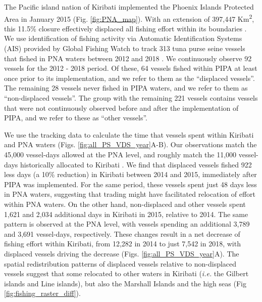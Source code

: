\documentclass[12pt]{article}
\begin{document}
The Pacific island nation of Kiribati implemented the Phoenix Islands Protected Area in January 2015 (Fig. \ref{fig:PNA_map}). With an extension of 397,447 Km\textsuperscript{2}, this 11.5\% closure effectively displaced all fishing effort within its boundaries \cite{mccauley_2016,mcdermott_2018}. We use identification of fishing activity via Automatic Identification Systems (AIS) provided by Global Fishing Watch to track 313 tuna purse seine vessels that fished in PNA waters between 2012 and 2018 \cite{kroodsma_2018}. We continuously observe 92 vessels for the 2012 - 2018 period. Of these, 64 vessels fished within PIPA at least once prior to its implementation, and we refer to them as the ``displaced vessels''. The remaining 28 vessels never fished in PIPA waters, and we refer to them as ``non-displaced vessels''. The group with the remaining 221 vessels contains vessels that were not continuously observed before and after the implementation of PIPA, and we refer to these as ``other vessels''.

We use the tracking data to calculate the time that vessels spent within Kiribati and PNA waters (Figs. \ref{fig:all_PS_VDS_year}A-B). Our observations match the 45,000 vessel-days allowed at the PNA level, and roughly match the 11,000 vessel-days historically allocated to Kiribati \cite{yeeting2018stabilising}. We find that displaced vessels fished 922 less days (a 10\% reduction) in Kiribati between 2014 and 2015, immediately after PIPA was implemented. For the same period, these vessels spent just 48 days less in PNA waters, suggesting that trading might have facilitated relocation of effort within PNA waters. On the other hand, non-displaced and other vessels spent 1,621 and 2,034 additional days in Kiribati in 2015, relative to 2014. The same pattern is observed at the PNA level, with vessels spending an additional 3,789 and 3,691 vessel-days, respectively. These changes result in a net decrease of fishing effort within Kiribati, from 12,282 in 2014 to just 7,542 in 2018, with displaced vessels driving the decrease (Figs. \ref{fig:all_PS_VDS_year}A). The spatial redistribution patterns of displaced vessels relative to non-displaced vessels suggest that some relocated to other waters in Kiribati (\emph{i.e.} the Gilbert islands and Line islands), but also the Marshall Islands and the high seas (Fig \ref{fig:fishing_raster_diff}).
\end{document}
